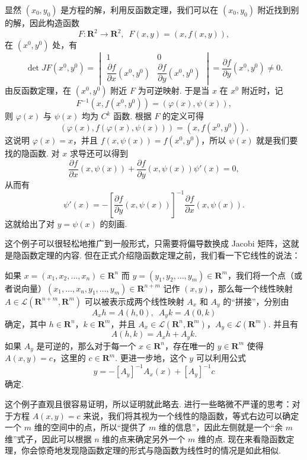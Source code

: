 \begin{solution}
    显然 $(x_0, y_0)$ 是方程的解，利用反函数定理，我们可以在 $(x_0, y_0)$ 附近找到别的解，因此构造函数\[F\colon \mathbf{R}^2\to \mathbf{R}^2,\enspace F(x, y) = (x, f(x, y)),\]
    在 $(x^0, y^0)$ 处，有 \[\det JF(x^0, y^0) = \begin{vmatrix}
            1                                        & 0                                        \\[1ex]
            \dfrac{\partial f}{\partial x}(x^0, y^0) & \dfrac{\partial f}{\partial y}(x^0, y^0)
        \end{vmatrix} = \dfrac{\partial f}{\partial y}(x^0, y^0)\neq 0.\]
    由反函数定理，在 $(x^0, y^0)$ 附近 $F$ 为可逆映射. 于是当 $x$ 在 $x^0$ 附近时，记 \[F^{-1}(x, f(x^0, y^0)) = (\varphi(x), \psi(x)),\]
    则 $\varphi(x)$ 与 $\psi(x)$ 均为 $C^k$ 函数. 根据 $F$ 的定义可得 \[(\varphi(x), f(\varphi(x), \psi(x))) = (x, f(x^0, y^0)).\]
    这说明 $\varphi(x) = x$，并且 $f(x, \psi(x)) = f(x^0, y^0)$，所以 $\psi(x)$ 就是我们要找的隐函数. 对 $x$ 求导还可以得到 \[\frac{\partial f}{\partial x}(x, \psi(x)) + \frac{\partial f}{\partial y}(x, \psi(x))\psi'(x) = 0,\]
    从而有 \[\psi'(x) = -[\frac{\partial f}{\partial y}(x, \psi(x))]^{-1}\frac{\partial f}{\partial x}(x, \psi(x)).\]
    这就给出了对 $y = \psi(x)$ 的刻画.
\end{solution}

这个例子可以很轻松地推广到一般形式，只需要将偏导数换成 Jacobi 矩阵，这就是隐函数定理的内容. 但在正式介绍隐函数定理之前，我们看一下它线性的说法：

\begin{example}{}{}
    如果 $x = (x_1, x_2, \ldots, x_n)\in\mathbf{R}^n$ 而 $y = (y_1, y_2, \ldots, y_m)\in\mathbf{R}^m$，我们将一个点（或者说向量）$(x_1, \ldots, x_n, y_1, \ldots, y_m)\in \mathbf{R}^{n+m}$ 记作 $(x, y)$，那么每一个线性映射 $A\in \mathcal{L}(\mathbf{R}^{n+m}, \mathbf{R}^{m})$ 可以被表示成两个线性映射 $A_x$ 和 $A_y$ 的``拼接''，分别由 \[A_xh = A(h, 0),\enspace A_yk = A(0, k)\]
    确定，其中 $h\in\mathbf{R}^n$，$k\in\mathbf{R}^m$，并且 $A_x\in \mathcal{L}(\mathbf{R}^n, \mathbf{R}^m)$，$A_y\in \mathcal{L}(\mathbf{R}^m)$. 并且有 \[A(h, k) = A_xh + A_yk.\]
    如果 $A_y$ 是可逆的，那么对于每一个 $x\in\mathbf{R}^n$，存在唯一的 $y\in\mathbf{R}^m$ 使得 $A(x, y) = c$，这里的 $c\in\mathbf{R}^m$. 更进一步地，这个 $y$ 可以利用公式 \[y = -[A_y]^{-1}A_x(x) + [A_y]^{-1}c\] 确定.
\end{example}

这个例子直观且很容易证明，所以证明就此略去. 进行一些略微不严谨的思考：对于方程 $A(x, y) = c$ 来说，我们将其视为一个线性的隐函数，等式右边可以确定一个 $m$ 维的空间中的点，所以``提供了 $m$ 维的信息''，因此左侧就是一个``余 $m$ 维''式子，因此可以根据 $n$ 维的点来确定另外一个 $m$ 维的点. 现在来看隐函数定理，你会惊奇地发现隐函数定理的形式与隐函数为线性时的情况是如此相似.

